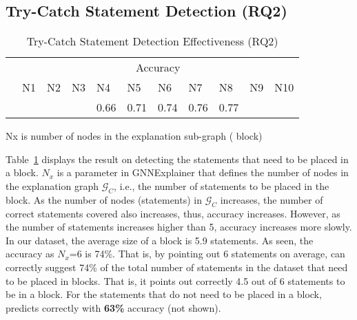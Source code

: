 \subsection{Try-Catch Statement Detection (RQ2)}
\label{sec:rq2}

\begin{table}[t]
  \caption{Try-Catch Statement Detection Effectiveness (RQ2)}
  \vspace{-12pt}
	\begin{center}
		\small
		\renewcommand{\arraystretch}{1} 
		\begin{tabular}{p{0.8cm}<{\centering}|p{0.4cm}<{\centering}|p{0.4cm}<{\centering}|p{0.4cm}<{\centering}|p{0.4cm}<{\centering}|p{0.4cm}<{\centering}|p{0.4cm}<{\centering}|p{0.4cm}<{\centering}|p{0.4cm}<{\centering}|p{0.4cm}<{\centering}|p{0.4cm}<{\centering}}
			\hline
			 	&  \multicolumn{10}{c}{Accuracy} \\
			\cline{2-11}
			     	&  N1  & N2   &  N3  & N4   &N5    & N6   &N7    & N8   &N9    & N10 \\
			\hline
			\tool       &  &  &  & 0.66 & 0.71 & 0.74 & 0.76 & 0.77 &  &   \\
			\hline
		\end{tabular}
		Nx is number of nodes in the explanation
                sub-graph ( block)
		\label{tab:rq2}
	\end{center}
\end{table}

Table~\ref{tab:rq2} displays the result on detecting the statements
that need to be placed in a  block. $N_x$ is a parameter
in GNNExplainer that defines the number of nodes in the explanation
graph $\mathcal{G}_C$, i.e., the number of statements to be placed in the
 block.
%
As the number of nodes (statements) in $\mathcal{G}_C$ increases, the
number of correct statements covered also increases, thus, accuracy
increases. However, as the number of statements increases higher than
5, accuracy increases more slowly. In our dataset, the average size of
a  block is 5.9 statements. As seen, the accuracy as
$N_x$=6 is 74\%. That is, by pointing out 6 statements on average,
{\tool} can correctly suggest 74\% of the total number of statements
in the dataset that need to be placed in 
blocks. That is, it points out correctly 4.5 out of 6 statements to be
in a  block. For the statements that do not need to be
placed in a  block, {\tool} predicts correctly with
{\bf 63\%} accuracy (not shown).


